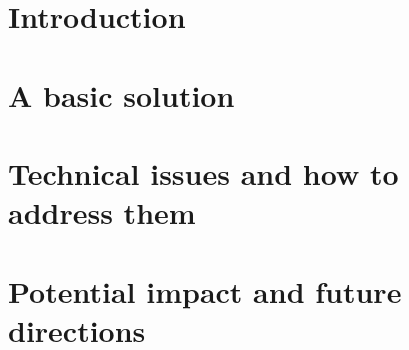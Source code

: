 \documentclass[conference]{IEEEtran}
\begin{document}
\section{Introduction}
\label{sec:intro}



\section{A basic solution}
\label{sec:basic}



\section{Technical issues and how to address them}
\label{sec:tech}



\section{Potential impact and future directions}
\label{sec:future}




\end{document}
